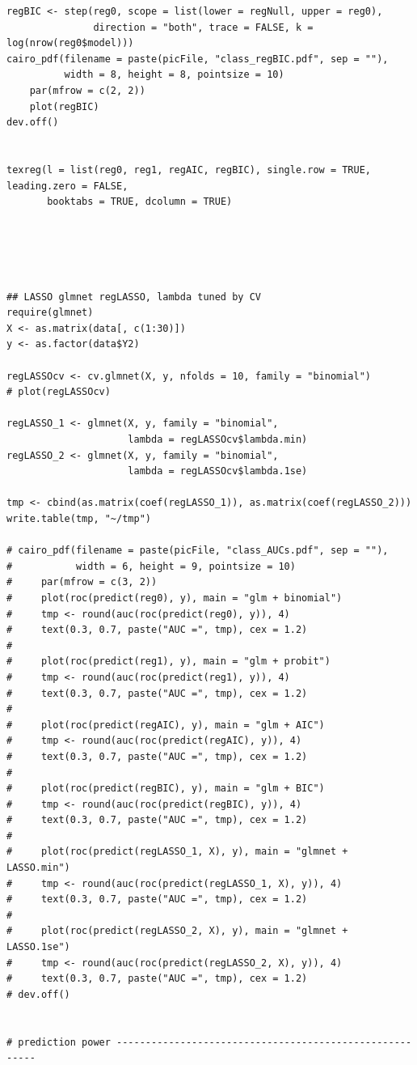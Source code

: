 \documentclass[11pt,oneside,a4paper]{article}
\begin{document}
\begin{verbatim}
regBIC <- step(reg0, scope = list(lower = regNull, upper = reg0), 
               direction = "both", trace = FALSE, k = log(nrow(reg0$model)))
cairo_pdf(filename = paste(picFile, "class_regBIC.pdf", sep = ""), 
          width = 8, height = 8, pointsize = 10)
    par(mfrow = c(2, 2))
    plot(regBIC)
dev.off()


texreg(l = list(reg0, reg1, regAIC, regBIC), single.row = TRUE, leading.zero = FALSE, 
       booktabs = TRUE, dcolumn = TRUE)





## LASSO glmnet regLASSO, lambda tuned by CV
require(glmnet)
X <- as.matrix(data[, c(1:30)])
y <- as.factor(data$Y2)

regLASSOcv <- cv.glmnet(X, y, nfolds = 10, family = "binomial")
# plot(regLASSOcv)

regLASSO_1 <- glmnet(X, y, family = "binomial", 
                     lambda = regLASSOcv$lambda.min)
regLASSO_2 <- glmnet(X, y, family = "binomial", 
                     lambda = regLASSOcv$lambda.1se)

tmp <- cbind(as.matrix(coef(regLASSO_1)), as.matrix(coef(regLASSO_2)))
write.table(tmp, "~/tmp")

# cairo_pdf(filename = paste(picFile, "class_AUCs.pdf", sep = ""), 
#           width = 6, height = 9, pointsize = 10)
#     par(mfrow = c(3, 2))
#     plot(roc(predict(reg0), y), main = "glm + binomial")
#     tmp <- round(auc(roc(predict(reg0), y)), 4)
#     text(0.3, 0.7, paste("AUC =", tmp), cex = 1.2)
# 
#     plot(roc(predict(reg1), y), main = "glm + probit")
#     tmp <- round(auc(roc(predict(reg1), y)), 4)
#     text(0.3, 0.7, paste("AUC =", tmp), cex = 1.2)
# 
#     plot(roc(predict(regAIC), y), main = "glm + AIC")
#     tmp <- round(auc(roc(predict(regAIC), y)), 4)
#     text(0.3, 0.7, paste("AUC =", tmp), cex = 1.2)
# 
#     plot(roc(predict(regBIC), y), main = "glm + BIC")
#     tmp <- round(auc(roc(predict(regBIC), y)), 4)
#     text(0.3, 0.7, paste("AUC =", tmp), cex = 1.2)
# 
#     plot(roc(predict(regLASSO_1, X), y), main = "glmnet + LASSO.min")
#     tmp <- round(auc(roc(predict(regLASSO_1, X), y)), 4)
#     text(0.3, 0.7, paste("AUC =", tmp), cex = 1.2)
# 
#     plot(roc(predict(regLASSO_2, X), y), main = "glmnet + LASSO.1se")
#     tmp <- round(auc(roc(predict(regLASSO_2, X), y)), 4)
#     text(0.3, 0.7, paste("AUC =", tmp), cex = 1.2)
# dev.off()


# prediction power --------------------------------------------------------



\end{verbatim}
\end{document}
